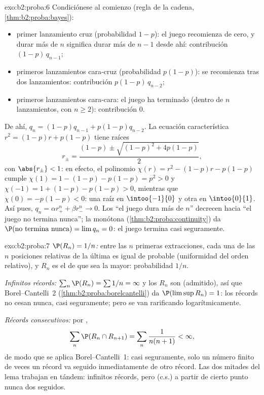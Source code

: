 \begin{solution}{exo:b2:proba:6}
Condiciónese al comienzo (regla de la cadena,
\cref{thm:b2:proba:bayes}):
\begin{itemize}
\item primer lanzamiento cruz (probabilidad $1 - p$): el juego
recomienza de cero, y durar más de $n$ significa durar más de $n - 1$
desde ahí: contribución $(1-p)\,q_{n-1}$;
\item primeros lanzamientos cara-cruz (probabilidad $p(1-p)$): se
recomienza tras dos lanzamientos: contribución $p(1-p)\,q_{n-2}$;
\item primeros lanzamientos cara-cara: el juego ha terminado (dentro
de $n$ lanzamientos, con $n \geq 2$): contribución $0$.
\end{itemize}
De ahí, $q_n = (1-p)q_{n-1} + p(1-p)q_{n-2}$. La ecuación
característica $r^2 = (1-p)r + p(1-p)$ tiene raíces
\[
r_\pm = \frac{(1-p) \pm \sqrt{(1-p)^2 + 4p(1-p)}}{2},
\]
con $\abs{r_\pm} < 1$: en efecto, el polinomio $\chi(r) = r^2 -
(1-p)r - p(1-p)$ cumple $\chi(1) = 1 - (1-p) - p(1-p) = p^2 > 0$ y
$\chi(-1) = 1 + (1-p) - p(1-p) > 0$, mientras que $\chi(0) = -p(1-p)
< 0$: una raíz en $\intoo{-1}{0}$ y otra en $\intoo{0}{1}$. Así pues,
$q_n = \alpha r_+^n + \beta r_-^n \to 0$. Los  ``el juego dura
más de $n$'' decrecen hacia ``el juego no termina nunca''; la
 monótona (\cref{thm:b2:proba:continuity}) da $\P(\text{no
termina nunca}) = \lim q_n = 0$: el juego termina casi seguramente.
\end{solution}

\begin{solution}{exo:b2:proba:7}
\emph{$\P(R_n) = 1/n$:} entre las $n$ primeras extracciones, cada una
de las $n$ posiciones relativas de la última es igual de probable
(uniformidad del orden relativo), y $R_n$ es el  de que sea la
mayor: probabilidad $1/n$.

\emph{Infinitos récords:} $\sum_n \P(R_n) = \sum 1/n = \infty$ y los
$R_n$ son  (admitido), así que Borel--Cantelli~2
(\cref{thm:b2:proba:borelcantelli}) da $\P(\limsup R_n) = 1$: los
récords no cesan nunca, casi seguramente; pero se van rarificando
logarítmicamente.

\emph{Récords consecutivos:} por ,
\[
\sum_n \P(R_n \cap R_{n+1})
= \sum_n \frac{1}{n(n+1)} < \infty ,
\]
de modo que se aplica Borel--Cantelli~1: casi seguramente, solo un
número finito de veces un récord va seguido inmediatamente de otro
récord. Las dos mitades del lema trabajan en tándem: infinitos
récords, pero (c.s.) a partir de cierto punto nunca dos seguidos.
\end{solution}

